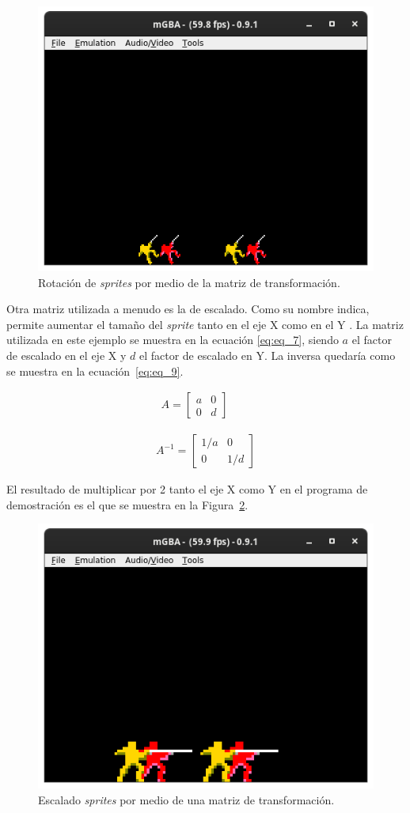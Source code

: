 \begin{figure}[h]
	\centering
	\includegraphics[width=.5\textwidth]{capitulos/capitulo3/rot_45.png}
	\caption{Rotación de \textit{sprites} por medio de la matriz de transformación.}
	\label{fig:rot_45}
\end{figure}
\FloatBarrier

Otra matriz utilizada a menudo es la de escalado. Como su nombre indica, permite aumentar el tamaño del \textit{sprite} tanto en el eje X como en el Y \cite{bib:aff_matrix}. La matriz utilizada en este ejemplo se muestra en la ecuación \eqref{eq:eq_7}, siendo $a$ el factor de escalado en el eje X y $d$ el factor de escalado en Y. La inversa quedaría como se muestra en la ecuación~\eqref{eq:eq_9}.

\begin{align}
	A
	=
	\begin{bmatrix}
		a & 0 \\
		0 & d
	\end{bmatrix}
	\qquad
\end{align}

\begin{align}
	A^{-1}
	=
	\begin{bmatrix}
		1/a & 0 \\
		0 & 1/d
	\end{bmatrix}
	\label{eq:eq_9}
\end{align}

El resultado de multiplicar por 2 tanto el eje X como Y en el programa de demostración es el que se muestra en la Figura~\ref{fig:scale_2}.

\begin{figure}[h]
	\centering
	\includegraphics[width=.5\textwidth]{capitulos/capitulo3/scale_2.png}
	\caption{Escalado \textit{sprites} por medio de una matriz de transformación.}
	\label{fig:scale_2}
\end{figure}
\FloatBarrier{}

